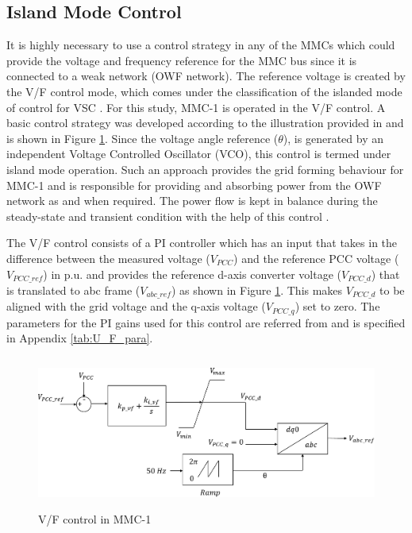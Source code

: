 \subsection{Island Mode Control}
It is highly necessary to use a control strategy in any of the \gls{MMC}s which could provide the voltage and frequency reference for the \gls{MMC} bus since it is connected to a weak network (\gls{OWF} network). The reference voltage is created by the V/F control mode, which comes under the classification of the islanded mode of control for \gls{VSC} \cite{vrana2013cigre}. For this study, \gls{MMC}-1 is operated in the V/F control. A basic control strategy was developed according to the illustration provided in \cite{wachal2014guide} and is shown in Figure \ref{fig:U_F_control}. Since the voltage angle reference ($\theta$), is generated by an independent Voltage Controlled Oscillator (VCO), this control is termed under island mode operation. Such an approach provides the grid forming behaviour for \gls{MMC}-1 and is responsible for providing and absorbing power from the \gls{OWF} network as and when required. The power flow is kept in balance during the steady-state and transient condition with the help of this control \cite{cigre_B455}.  

The V/F control consists of a \gls{PI} controller which has an input that takes in the difference between the measured voltage ($V_{PCC}$) and the reference \gls{PCC} voltage ($V_{PCC\_ref}$) in p.u. and provides the reference d-axis converter voltage ($V_{PCC\_d}$) that is translated to abc frame ($V_{abc\_ref}$) as shown in Figure \ref{fig:U_F_control}. This makes $V_{PCC\_d}$ to be aligned with the grid voltage and the q-axis voltage ($V_{PCC\_q}$) set to zero. The parameters for the \gls{PI} gains used for this control are referred from \cite{vrana2013cigre} and is specified in Appendix \ref{tab:U_F_para}. 

\begin{figure}[H]
\centering
    \includegraphics[height = 5cm,width = 12.5cm]{Diagrams/Chapter_4/U_F_control.pdf}
    \caption{V/F control in MMC-1 \cite{vrana2013cigre}}
    \label{fig:U_F_control}
\end{figure}


